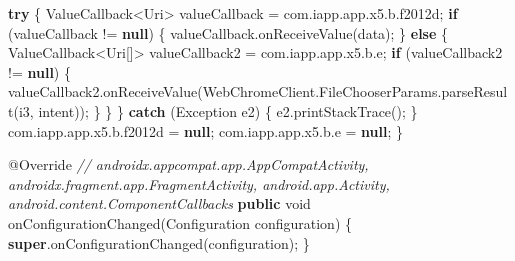 \documentclass[
]{article}
\newenvironment{Shaded}{}{}
\newcommand{\AttributeTok}[1]{\textcolor[rgb]{0.49,0.56,0.16}{#1}}
\newcommand{\BuiltInTok}[1]{\textcolor[rgb]{0.00,0.50,0.00}{#1}}
\newcommand{\CommentTok}[1]{\textcolor[rgb]{0.38,0.63,0.69}{\textit{#1}}}
\newcommand{\ControlFlowTok}[1]{\textcolor[rgb]{0.00,0.44,0.13}{\textbf{#1}}}
\newcommand{\DataTypeTok}[1]{\textcolor[rgb]{0.56,0.13,0.00}{#1}}
\newcommand{\FunctionTok}[1]{\textcolor[rgb]{0.02,0.16,0.49}{#1}}
\newcommand{\KeywordTok}[1]{\textcolor[rgb]{0.00,0.44,0.13}{\textbf{#1}}}
\newcommand{\NormalTok}[1]{#1}
\newcommand{\OperatorTok}[1]{\textcolor[rgb]{0.40,0.40,0.40}{#1}}
\begin{document}
\begin{Shaded}
\begin{Highlighting}[]
        \ControlFlowTok{try} \OperatorTok{\{}
\NormalTok{            ValueCallback}\OperatorTok{\textless{}}\NormalTok{Uri}\OperatorTok{\textgreater{}}\NormalTok{ valueCallback }\OperatorTok{=}\NormalTok{ com}\OperatorTok{.}\FunctionTok{iapp}\OperatorTok{.}\FunctionTok{app}\OperatorTok{.}\FunctionTok{x5}\OperatorTok{.}\FunctionTok{b}\OperatorTok{.}\FunctionTok{f2012d}\OperatorTok{;}
            \ControlFlowTok{if} \OperatorTok{(}\NormalTok{valueCallback }\OperatorTok{!=} \KeywordTok{null}\OperatorTok{)} \OperatorTok{\{}
\NormalTok{                valueCallback}\OperatorTok{.}\FunctionTok{onReceiveValue}\OperatorTok{(}\NormalTok{data}\OperatorTok{);}
            \OperatorTok{\}} \ControlFlowTok{else} \OperatorTok{\{}
\NormalTok{                ValueCallback}\OperatorTok{\textless{}}\NormalTok{Uri}\OperatorTok{[]\textgreater{}}\NormalTok{ valueCallback2 }\OperatorTok{=}\NormalTok{ com}\OperatorTok{.}\FunctionTok{iapp}\OperatorTok{.}\FunctionTok{app}\OperatorTok{.}\FunctionTok{x5}\OperatorTok{.}\FunctionTok{b}\OperatorTok{.}\FunctionTok{e}\OperatorTok{;}
                \ControlFlowTok{if} \OperatorTok{(}\NormalTok{valueCallback2 }\OperatorTok{!=} \KeywordTok{null}\OperatorTok{)} \OperatorTok{\{}
\NormalTok{                    valueCallback2}\OperatorTok{.}\FunctionTok{onReceiveValue}\OperatorTok{(}\NormalTok{WebChromeClient}\OperatorTok{.}\FunctionTok{FileChooserParams}\OperatorTok{.}\FunctionTok{parseResult}\OperatorTok{(}\NormalTok{i3}\OperatorTok{,}\NormalTok{ intent}\OperatorTok{));}
                \OperatorTok{\}}
            \OperatorTok{\}}
        \OperatorTok{\}} \ControlFlowTok{catch} \OperatorTok{(}\BuiltInTok{Exception}\NormalTok{ e2}\OperatorTok{)} \OperatorTok{\{}
\NormalTok{            e2}\OperatorTok{.}\FunctionTok{printStackTrace}\OperatorTok{();}
        \OperatorTok{\}}
\NormalTok{        com}\OperatorTok{.}\FunctionTok{iapp}\OperatorTok{.}\FunctionTok{app}\OperatorTok{.}\FunctionTok{x5}\OperatorTok{.}\FunctionTok{b}\OperatorTok{.}\FunctionTok{f2012d} \OperatorTok{=} \KeywordTok{null}\OperatorTok{;}
\NormalTok{        com}\OperatorTok{.}\FunctionTok{iapp}\OperatorTok{.}\FunctionTok{app}\OperatorTok{.}\FunctionTok{x5}\OperatorTok{.}\FunctionTok{b}\OperatorTok{.}\FunctionTok{e} \OperatorTok{=} \KeywordTok{null}\OperatorTok{;}
    \OperatorTok{\}}

    \AttributeTok{@Override} \CommentTok{// androidx.appcompat.app.AppCompatActivity, androidx.fragment.app.FragmentActivity, android.app.Activity, android.content.ComponentCallbacks}
    \KeywordTok{public} \DataTypeTok{void} \FunctionTok{onConfigurationChanged}\OperatorTok{(}\BuiltInTok{Configuration}\NormalTok{ configuration}\OperatorTok{)} \OperatorTok{\{}
        \KeywordTok{super}\OperatorTok{.}\FunctionTok{onConfigurationChanged}\OperatorTok{(}\NormalTok{configuration}\OperatorTok{);}
    \OperatorTok{\}}


\end{Highlighting}
\end{Shaded}
\end{document}
